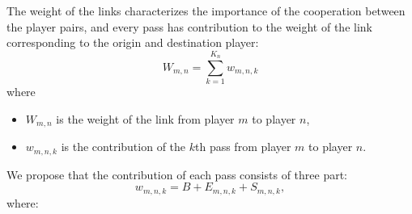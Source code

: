 \documentclass[12pt]{article}
\begin{document}
The weight of the links characterizes the importance of the cooperation between the player pairs, and every pass has contribution to the weight of the link corresponding to the origin and destination player:
\begin{equation}
	\label{linkweight}W_{m,n}=\sum_{k=1}^{K_n}w_{m,n,k}
\end{equation}
where
\begin{itemize}
	\item[] $W_{m,n}$ is the weight of the link from player $m$ to player $n$,
	\item[] $w_{m,n,k}$ is the contribution of the $k$th pass from player $m$ to player $n$.
\end{itemize}
We propose that the contribution of each pass consists of three part:
\begin{equation}
	w_{m,n,k}=B+E_{m,n,k}+S_{m,n,k},
\end{equation}
where:
\end{document}
